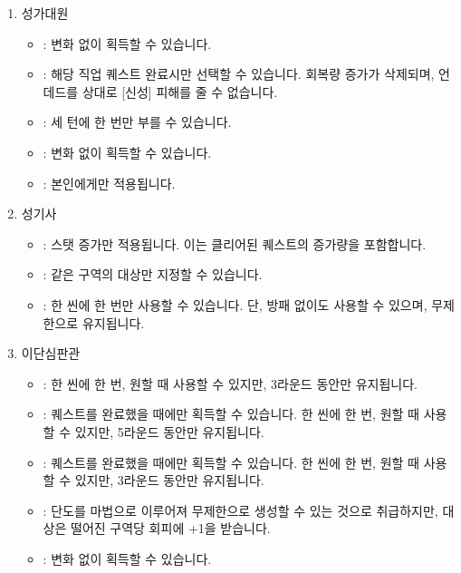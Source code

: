 \documentclass{report}
\begin{document}
		\begin{enumerate}
			\item 성가대원
				\begin{itemize}
					\item {}: 변화 없이 획득할 수 있습니다.
					\item {}: 해당 직업 퀘스트 완료시만 선택할 수 있습니다. 회복량 증가가 삭제되며, 언데드를 상대로 [신성] 피해를 줄 수 없습니다.
					\item {}: 세 턴에 한 번만 부를 수 있습니다.
					\item {}: 변화 없이 획득할 수 있습니다.
					\item {}: 본인에게만 적용됩니다.
				\end{itemize}
			\item 성기사
				\begin{itemize}
					\item {}: 스탯 증가만 적용됩니다. 이는 클리어된 퀘스트의 증가량을 포함합니다.
					\item {}: 같은 구역의 대상만 지정할 수 있습니다.
					\item {}: 한 씬에 한 번만 사용할 수 있습니다. 단, 방패 없이도 사용할 수 있으며, 무제한으로 유지됩니다.
				\end{itemize}
			\item 이단심판관
				\begin{itemize}
					\item {}: 한 씬에 한 번, 원할 때 사용할 수 있지만, 3라운드 동안만 유지됩니다.
					\item {}: 퀘스트를 완료했을 때에만 획득할 수 있습니다. 한 씬에 한 번, 원할 때 사용할 수 있지만, 5라운드 동안만 유지됩니다.
					\item {}: 퀘스트를 완료했을 때에만 획득할 수 있습니다. 한 씬에 한 번, 원할 때 사용할 수 있지만, 3라운드 동안만 유지됩니다.
					\item {}: 단도를 마법으로 이루어져 무제한으로 생성할 수 있는 것으로 취급하지만, 대상은 떨어진 구역당 회피에 +1을 받습니다.
					\item {}: 변화 없이 획득할 수 있습니다.
				\end{itemize}
		\end{enumerate}
	
\end{document}
